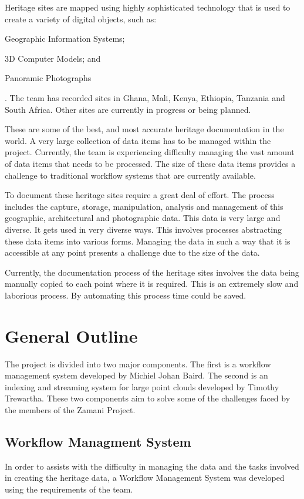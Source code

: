     Heritage sites are mapped using highly sophisticated technology that is
    used to create a variety of digital objects, such as:
    \begin{inparaenum}[i)] \item Geographic Information Systems; \item 3D
    Computer Models; and \item Panoramic Photographs\end{inparaenum}.
    The team has recorded sites in Ghana, Mali, Kenya, Ethiopia, Tanzania and
    South Africa. Other sites are currently in progress or being planned.

    These are some of the best, and most accurate heritage documentation
    in the world.
    A very large collection of data items has to be managed
    within the project. Currently, the team is experiencing difficulty managing
    the vast amount of data items that needs to be processed. The size of these
    data items provides a challenge to traditional workflow systems that are
    currently available.

    To document these heritage sites require a great deal of effort. The process includes
    the capture, storage, manipulation, analysis and management of this geographic,
    architectural and photographic data. This data is very large and diverse. It gets
    used in very diverse ways. This involves processes abstracting these data
    items into various forms. Managing the data in such a way that it is accessible
    at any point presents a challenge due to the size of the data.

    Currently, the documentation process of the heritage sites involves the data being
    manually copied to each point where it is required. This is an extremely slow and
    laborious process. By automating this process time could be saved.



\section{General Outline}
    The project is divided into two major components. The first is a
    workflow management system developed by Michiel Johan Baird. The
    second is an indexing and streaming system for large point clouds
    developed by Timothy Trewartha. These two components aim to solve some
    of the challenges faced by the members of the Zamani Project.
    \subsection{Workflow Managment System}
        In order to assists with the difficulty in managing the data and the tasks involved
        in creating the heritage data, a Workflow Management System was developed using
        the requirements of the team.


